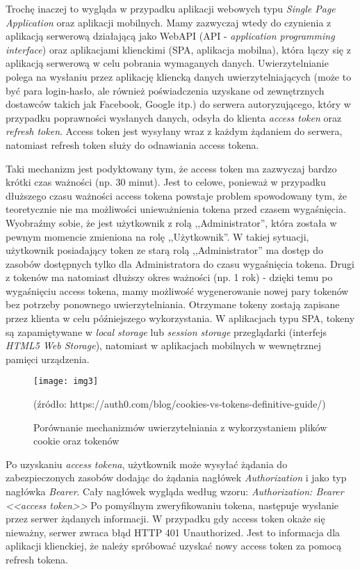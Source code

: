 Trochę inaczej to wygląda w przypadku aplikacji webowych typu \textit{Single Page Application} oraz aplikacji mobilnych. Mamy zazwyczaj wtedy do czynienia z aplikacją serwerową działającą jako WebAPI (API - \textit{application programming interface}) oraz aplikacjami klienckimi (SPA, aplikacja mobilna), która łączy się z aplikacją serwerową w celu pobrania wymaganych danych. Uwierzytelnianie polega na wysłaniu przez aplikację kliencką danych uwierzytelniających (może to być para login-hasło, ale również poświadczenia uzyskane od zewnętrznych dostawców takich jak Facebook, Google itp.) do serwera autoryzującego, który w przypadku poprawności wysłanych danych, odsyła do klienta \textit{access token} oraz \textit{refresh token}. Access token jest wysyłany wraz z każdym żądaniem do serwera, natomiast refresh token służy do odnawiania access tokena.

Taki mechanizm jest podyktowany tym, że access token ma zazwyczaj bardzo krótki czas ważności (np. 30 minut). Jest to celowe, ponieważ w przypadku dłuższego czasu ważności access tokena powstaje problem spowodowany tym, że teoretycznie nie ma możliwości unieważnienia tokena przed czasem wygaśnięcia. Wyobraźmy sobie, że jest użytkownik z rolą ,,Administrator'', która została w pewnym momencie zmieniona na rolę ,,Użytkownik''. W takiej sytuacji, użytkownik posiadający token ze starą rolą ,,Administrator'' ma dostęp do zasobów dostępnych tylko dla Administratora do czasu wygaśnięcia tokena. Drugi z tokenów ma natomiast dłuższy okres ważności (np. 1 rok) - dzięki temu po wygaśnięciu access tokena, mamy możliwość wygenerowanie nowej pary tokenów bez potrzeby ponownego uwierzytelniania.
\newpage
Otrzymane tokeny zostają zapisane przez klienta w celu późniejszego wykorzystania. W aplikacjach typu SPA, tokeny są zapamiętywane w \textit{local storage} lub \textit{session storage} przeglądarki (interfejs \textit{HTML5 Web Storage}), natomiast w aplikacjach mobilnych w wewnętrznej pamięci urządzenia. 

\begin{figure}[h!]
\centering
\texttt{[image: img3]}
\caption{Porównanie mechanizmów uwierzytelniania z wykorzystaniem plików cookie oraz tokenów}
(źródło: https://auth0.com/blog/cookies-vs-tokens-definitive-guide/)
\end{figure}

Po uzyskaniu \textit{access tokena}, użytkownik może wysyłać żądania do zabezpieczonych zasobów dodając do żądania nagłówek \textit{Authorization} i jako typ nagłówka \textit{Bearer}. Cały nagłówek wygląda według wzoru: \textit{Authorization: Bearer <<access token>>} Po pomyślnym zweryfikowaniu tokena, następuje wysłanie przez serwer żądanych informacji. W przypadku gdy access token okaże się nieważny, serwer zwraca błąd HTTP 401 Unauthorized. Jest to informacja dla aplikacji klienckiej, że należy spróbować uzyskać nowy access token za pomocą refresh tokena.

